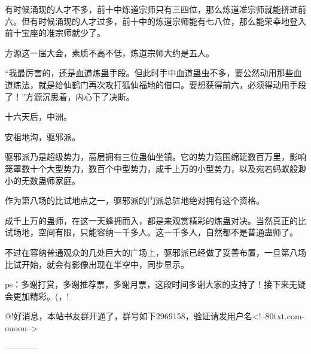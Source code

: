 \begin{this_body}
有时候涌现的人才不多，前十中炼道宗师只有三四位，那么炼道准宗师就能挤进前六。但有时候涌现的人才过多，前十中的炼道宗师能有七八位，那么能荣幸地登入前十宝座的准宗师就少了。

方源这一届大会，素质不高不低，炼道宗师大约是五人。

“我最厉害的，还是血道炼蛊手段。但此时手中血道蛊虫不多，要公然动用那些血道炼法，就是给仙鹤门再次攻打狐仙福地的借口。要想获得前六，必须得动用手段了！”方源沉思着，内心下了决断。

十六天后，中洲。

安祖地沟，驱邪派。

驱邪派乃是超级势力，高层拥有三位蛊仙坐镇。它的势力范围绵延数百万里，影响笼罩数十个大型势力，数百个中型势力，成千上万的小型势力，以及宛若蚂蚁般渺小的无数蛊师家庭。

作为第八场的比试地点之一，驱邪派的门派总驻地绝对拥有这个资格。

成千上万的蛊师，在这一天蜂拥而入，都是来观赏精彩的炼蛊对决。当然真正的比试场地，空间有限，只能容纳一千多人。这一千多人，自然都不是普通蛊师了。

不过在容纳普通观众的几处巨大的广场上，驱邪派已经做了妥善布置，一旦第八场比试开始，就会有影像出现在半空中，同步显示。

ps：多谢打赏，多谢推荐票，多谢月票，这段时间多谢大家的支持了！接下来无疑会更加精彩。(，!

@!好消息，本站书友群开通了，群号如下2969158，验证请发用户名<!--80txt.com-ouoou-->

------------

\end{this_body}

